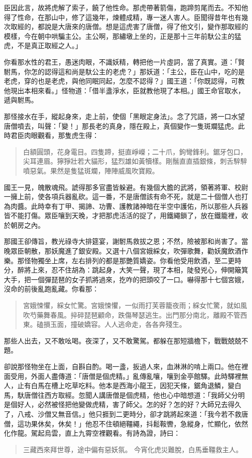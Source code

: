 臣因此言，故將虎解了索子，饒了他性命。那虎帶著箭傷，跑蹄剪尾而去。不知他得了性命，在那山中，修了這幾年，煉體成精，專一迷人害人。臣聞得昔年也有幾次取經的，都說是大唐來的唐僧。想是這虎害了唐僧，得了他文引，變作那取經的模樣，今在朝中哄騙主公。主公啊，那繡墩上坐的，正是那十三年前馱公主的猛虎，不是真正取經之人。」

你看那水性的君王，愚迷肉眼，不識妖精，轉把他一片虛詞，當了真實。道：「賢駙馬，你怎的認得這和尚是馱公主的老虎？」那妖道：「主公，臣在山中，吃的是老虎，穿的也是老虎，與他同眠同起，怎麼不認得？」國王道：「你既認得，可教他現出本相來看。」怪物道：「借半盞淨水，臣就教他現了本相。」國王命官取水，遞與駙馬。

那怪接水在手，縱起身來，走上前，使個「黑眼定身法」。念了咒語，將一口水望唐僧噴去，叫聲：「變！」那長老的真身，隱在殿上，真個變作一隻斑斕猛虎。此時君臣肉眼觀看，那隻虎生得：
\begin{quote}
白額圓頭，花身電目。四隻蹄，挺直崢嶸；二十爪，鉤彎鋒利。鋸牙包口，尖耳連眉。獰猙壯若大貓形，猛烈雄如黃犢樣。剛鬚直直插銀條，刺舌騂騂噴惡氣。果然是隻猛斑斕，陣陣威風吹寶殿。
\end{quote}

國王一見，魄散魂飛。諕得那多官盡皆躲避。有幾個大膽的武將，領著將軍、校尉一擁上前，使各項兵器亂砍。這一番，不是唐僧該有命不死，就是二十個僧人也打為肉醬。此時幸有丁甲、揭諦、功曹、護教諸神暗在半空中護佑，所以那些人兵器皆不能打傷。眾臣嚷到天晚，才把那虎活活的捉了，用鐵繩鎖了，放在鐵籠裡，收於朝房之內。

那國王卻傳旨，教光祿寺大排筵宴，謝駙馬救拔之恩；不然，險被那和尚害了。當晚眾臣朝散，那妖魔進了銀安殿。又選十八個宮娥綵女，吹彈歌舞，勸妖魔飲酒作樂。那怪物獨坐上席，左右排列的都是那艷質嬌姿。你看他受用飲酒，至二更時分，醉將上來，忍不住胡為：跳起身，大笑一聲，現了本相，陡發兇心，伸開簸箕大手，把一個彈琵琶的女子抓將過來，扢咋的把頭咬了一口。嚇得那十七個宮娥，沒命的前後亂跑亂藏。你看那：
\begin{quote}
宮娥悚懼，綵女忙驚。宮娥悚懼，一似雨打芙蓉籠夜雨；綵女忙驚，就如風吹芍藥舞春風。捽碎琵琶顧命，跌傷琴瑟逃生。出門那分南北，離殿不管西東。磕損玉面，撞破嬌容。人人逃命走，各各奔殘生。
\end{quote}

那些人出去，又不敢吆喝。夜深了，又不敢驚駕。都躲在那短牆檐下，戰戰兢兢不題。

卻說那怪物坐在上面，自斟自酌。喝一盞，扳過人來，血淋淋的啃上兩口。他在裡面受用，外面人盡傳道：「唐僧是個虎精。」亂傳亂嚷，嚷到金亭館驛。此時驛裡無人，止有白馬在槽上吃草吃料。他本是西海小龍王，因犯天條，鋸角退鱗，變白馬，馱唐僧往西方取經。忽聞人講唐僧是個虎精，他也心中暗想道：「我師父分明是個好人，必然被怪把他變做虎精，害了師父。怎的好？怎的好？大師兄去得久了，八戒、沙僧又無音信。」他只捱到二更時分，卻才跳將起來道：「我今若不救唐僧，這功果休矣，休矣！」他忍不住頓絕韁繩，抖鬆鞍轡，急縱身，忙顯化，依然化作龍。駕起烏雲，直上九霄空裡觀看。有詩為證，詩曰：
\begin{quote}
三藏西來拜世尊，途中偏有惡妖氛。
今宵化虎災難脫，白馬垂韁救主人。
\end{quote}

